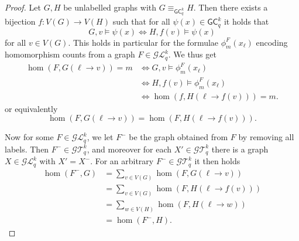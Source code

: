 \documentclass[10pt,a4paper]{article}
\newcommand{\Ekq}{\ensuremath{\mathcal{T}_{q}^{k}}}
\newcommand{\Lkq}{\ensuremath{\mathcal{L}_{q}^{k}}}
\newcommand{\GEkq}{\ensuremath{\mathcal{G}\Lkq}}
\newcommand{\GEkqLL}{\ensuremath{\mathcal{G}\Ekq}}
\newcommand{\lGC}{\ensuremath{\mathsf{GC}}}
\begin{document}
  \begin{proof}
  Let $G, H$ be unlabelled graphs with $G \equiv_{\lGC^k_q} H$. Then there exists a bijection $f \colon V(G) \to V(H)$ such that for all $\psi(x) \in \lGC^k_q$ it holds that
  \begin{equation*}
    G, v \models \psi(x) \iff H, f(v) \models \psi(x)
  \end{equation*}
  for all $v \in V(G)$. This holds in particular for the formulae $\phi^F_m(x_\ell)$ encoding homomorphism counts from a graph $F \in \GEkq$. We thus get
  \begin{align*}
    \hom(F, G(\ell \to v)) = m &\iff G, v \models \phi^F_m(x_\ell)\\
                               &\iff H, f(v) \models \phi^F_m(x_\ell)\\
                               &\iff \hom(f, H(\ell \to f(v))) = m.
  \end{align*}
  or equivalently
  \begin{equation*}
    \hom(F, G(\ell \to v)) = \hom(F, H(\ell \to f(v))).
  \end{equation*}

  Now for some $F \in \GEkq$, we let $F^-$ be the graph obtained from $F$ by removing all labels. Then $F^- \in \GEkqLL$, and moreover for each $X' \in \GEkqLL$ there is a graph $X \in \GEkq$ with $X' = X^-$. For an arbitrary $F^- \in \GEkqLL$ it then holds
  \begin{align*}
    \hom(F^-, G) &= \sum_{v \in V(G)}\hom(F, G(\ell \to v))\\
                 &= \sum_{v \in V(G)} \hom(F, H(\ell \to f(v)))\\
                 &= \sum_{w \in V(H)} \hom(F, H(\ell \to w))\\
                 &= \hom(F^-, H).
  \end{align*}
\end{proof}
\end{document}
